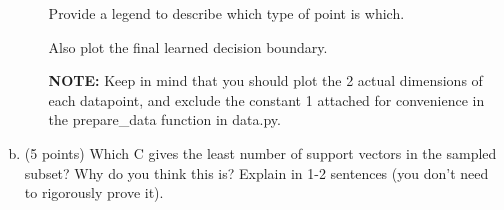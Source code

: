 \begin{enumerate}[(a)]
\begin{enumerate}[(i)]
Provide a legend to describe which type of point is which.

Also plot the final learned decision boundary.

\textbf{NOTE: } Keep in mind that you should plot the 2 actual dimensions of each datapoint, and exclude the constant 1 attached for convenience in the prepare\_data function in data.py.

\end{enumerate}


\item (5 points) Which C gives the least number of support vectors in the sampled subset? Why do you think this is? Explain in 1-2 sentences (you don't need to rigorously prove it).

\end{enumerate}

